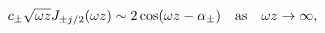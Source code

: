 \begin{equation} \label{bessel-asymp-before}
c_\pm
\sqrt{\omega z} J_{\pm j/2} (\omega z) \sim 2\cos (\omega z - 
\alpha_{\pm}) 
\textrm{\quad as\quad} \omega z \to \infty,
\end{equation}

